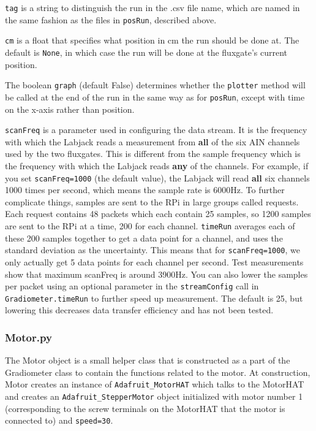 \documentclass{TheMartianReport}
\newcommand{\pyinline}[1]{\texttt{#1}}
\begin{document}
\pyinline{tag} is a string to distinguish the run in the .csv file name, which are named in the same fashion as the files in \pyinline{posRun}, described above.

\pyinline{cm} is a float that specifies what position in cm the run should be done at. The default is \pyinline{None}, in which case the run will be done at the fluxgate's current position.

The boolean \pyinline{graph} (default False) determines whether the \pyinline{plotter} method will be called at the end of the run in the same way as for \pyinline{posRun}, except with time on the x-axis rather than position.

\pyinline{scanFreq} is a parameter used in configuring the data stream. It is the frequency with which the Labjack reads a measurement from \textbf{all} of the six AIN channels used by the two fluxgates. This is different from the sample frequency which is the frequency with which the Labjack reads \textbf{any} of the channels. For example, if you set \pyinline{scanFreq=1000} (the default value), the Labjack will read \textbf{all} six channels 1000 times per second, which means the sample rate is 6000Hz. To further complicate things, samples are sent to the RPi in large groups called requests. Each request contains 48 packets which each contain 25 samples, so 1200 samples are sent to the RPi at a time, 200 for each channel. \pyinline{timeRun} averages each of these 200 samples together to get a data point for a channel, and uses the standard deviation as the uncertainty. This means that for \pyinline{scanFreq=1000}, we only actually get 5 data points for each channel per second. Test measurements show that maximum scanFreq is around 3900Hz. You can also lower the samples per packet using an optional parameter in the \pyinline{streamConfig} call in \pyinline{Gradiometer.timeRun} to further speed up measurement. The default is 25, but lowering this decreases data transfer efficiency and has not been tested.

\subsubsection{Motor.py}
The Motor object is a small helper class that is constructed as a part of the Gradiometer class to contain the functions related to the motor. At construction, Motor creates an instance of \pyinline{Adafruit_MotorHAT} which talks to the MotorHAT and creates an \pyinline{Adafruit_StepperMotor} object initialized with motor number 1 (corresponding to the screw terminals on the MotorHAT that the motor is connected to) and \pyinline{speed=30}.
\end{document}
